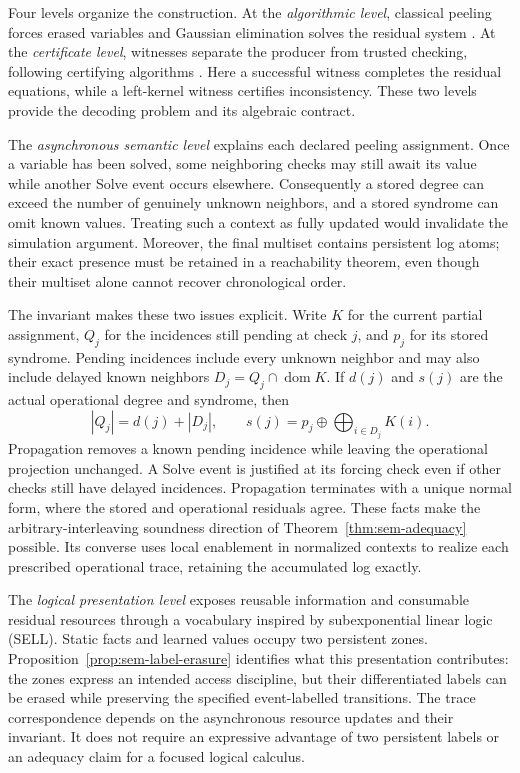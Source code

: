 \documentclass{lmcs}
\newcommand{\xor}{\oplus}
\newcommand{\bigxor}{\bigoplus}
\begin{document}
Four levels organize the construction. At the \emph{algorithmic level},
classical peeling forces erased variables and Gaussian elimination solves
the residual system
\cite{RichardsonUrbanke2008,BurshteinMiller2004ML}. At the
\emph{certificate level}, witnesses separate the producer from trusted
checking, following certifying algorithms
\cite{McConnellEtAl2011,AlkassarEtAl2013,Necula1997PCC}. Here a successful
witness completes the residual equations, while a left-kernel witness
certifies inconsistency. These two levels provide the decoding problem
and its algebraic contract.

The \emph{asynchronous semantic level} explains each declared peeling
assignment. Once a variable has been solved, some neighboring checks may
still await its value while another Solve event occurs elsewhere.
Consequently a stored degree can exceed the number of genuinely unknown
neighbors, and a stored syndrome can omit known values. Treating such a
context as fully updated would invalidate the simulation argument.
Moreover, the final multiset contains persistent log atoms; their exact
presence must be retained in a reachability theorem, even though their
multiset alone cannot recover chronological order.

The invariant makes these two issues explicit. Write $K$ for the current
partial assignment, $Q_j$ for the incidences still pending at check $j$,
and $p_j$ for its stored syndrome. Pending incidences include every unknown
neighbor and may also include delayed known neighbors
$D_j=Q_j\cap\operatorname{dom}K$. If $d(j)$ and $s(j)$ are the actual
operational degree and syndrome, then
\[
 |Q_j|=d(j)+|D_j|,\qquad
 s(j)=p_j\xor\bigxor_{i\in D_j}K(i).
\]
Propagation removes a known pending incidence while leaving the
operational projection unchanged. A Solve event is justified at its
forcing check even if other checks still have delayed incidences.
Propagation terminates with a unique normal form, where the stored and
operational residuals agree. These facts make the arbitrary-interleaving
soundness direction of Theorem~\ref{thm:sem-adequacy} possible. Its converse
uses local enablement in normalized contexts to realize each prescribed
operational trace, retaining the accumulated log exactly.

The \emph{logical presentation level} exposes reusable information and
consumable residual resources through a vocabulary inspired by
subexponential linear logic (SELL). Static facts and learned values occupy
two persistent zones. Proposition~\ref{prop:sem-label-erasure} identifies
what this presentation contributes: the zones express an intended access
discipline, but their differentiated labels can be erased while preserving
the specified event-labelled transitions. The trace correspondence depends
on the asynchronous resource updates and their invariant. It does not
require an expressive advantage of two persistent labels or an adequacy
claim for a focused logical calculus.
\end{document}
